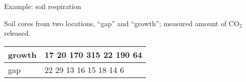 \begin{frame}{Example: soil respiration}

  Soil cores from two locations, ``gap'' and ``growth'';
  measured amount of CO${}_2$ released.

  \begin{center}
  \begin{tabular}{l|p{2.5in}}
    growth & 17 \hspace{.25em} 20 \hspace{.25em} 170 \hspace{.25em} 315 \hspace{.25em} 22 \hspace{.25em} 190 \hspace{.25em} 64 \\
    \hline
    gap & 22 \hspace{.25em} 29 \hspace{.25em} 13 \hspace{.25em} 16 \hspace{.25em} 15 \hspace{.25em} 18 \hspace{.25em} 14 \hspace{.25em} 6 \\
  \end{tabular}
  
  \vspace{2em}

  \end{center}

\end{frame}

